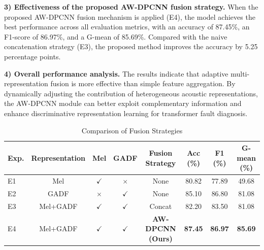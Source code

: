 \documentclass[anonymous]{iopjournal}
\begin{document}
\textbf{3) Effectiveness of the proposed AW-DPCNN fusion strategy.}
When the proposed AW-DPCNN fusion mechanism is applied (E4), the model achieves the best performance across all evaluation metrics, with an accuracy of 87.45\%, an F1-score of 86.97\%, and a G-mean of 85.69\%. Compared with the naive concatenation strategy (E3), the proposed method improves the accuracy by 5.25 percentage points.

\textbf{4) Overall performance analysis.}
The results indicate that adaptive multi-representation fusion is more effective than simple feature aggregation. By dynamically adjusting the contribution of heterogeneous acoustic representations, the AW-DPCNN module can better exploit complementary information and enhance discriminative representation learning for transformer fault diagnosis.

\begin{table}
	\centering
	\caption{Comparison of Fusion Strategies}
	\begin{tabular}{lccccccc}
		\toprule
		\textbf{Exp.} & \textbf{Representation} & \textbf{Mel} & \textbf{GADF} & \textbf{Fusion Strategy} 
		& \textbf{Acc (\%)} & \textbf{F1 (\%)} & \textbf{G-mean (\%)} \\
		\midrule
		E1 & Mel      & $\checkmark$ & $\times$ & None  
		& 80.82 & 77.89 & 49.68 \\
		E2 & GADF     & $\times$ & $\checkmark$ & None 
		& 85.10 & 86.80 & 81.08 \\
		E3 & Mel+GADF & $\checkmark$ & $\checkmark$ & Concat 
		& 82.20 & 83.50 & 81.08 \\
		E4 & Mel+GADF & $\checkmark$ & $\checkmark$ & \textbf{AW-DPCNN (Ours)} 
		& \textbf{87.45} & \textbf{86.97} & \textbf{85.69} \\
		\bottomrule
	\end{tabular}
	\label{tab:fusion_exp_simple}
\end{table}
\end{document}
